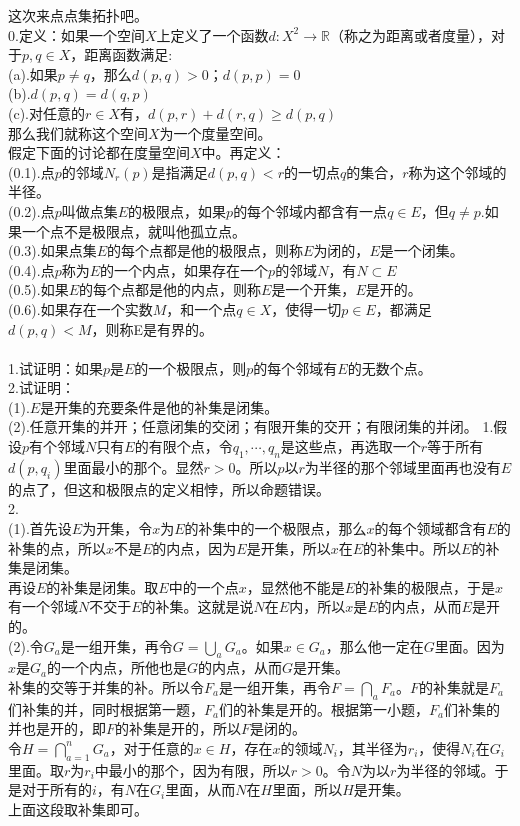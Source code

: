 \documentclass[11pt,a4paper,openany]{article}
\begin{document}
\noindent 这次来点点集拓扑吧。\\
0.定义：如果一个空间$X$上定义了一个函数$d:X^2\rightarrow\mathbb{R}$（称之为距离或者度量），对于$p,q\in X$，距离函数满足:\\
(a).如果$p\neq q$，那么$d(p,q)>0$；$d(p,p)=0$\\
(b).$d(p,q)=d(q,p)$\\
(c).对任意的$r\in X$有，$d(p,r)+d(r,q)\ge d(p,q)$\\
那么我们就称这个空间$X$为一个度量空间。\\
假定下面的讨论都在度量空间$X$中。再定义：\\
(0.1).点$p$的邻域$N_r(p)$是指满足$d(p,q)<r$的一切点$q$的集合，$r$称为这个邻域的半径。\\
(0.2).点$p$叫做点集$E$的极限点，如果$p$的每个邻域内都含有一点$q\in E$，但$q \neq p$.如果一个点不是极限点，就叫他孤立点。\\
(0.3).如果点集$E$的每个点都是他的极限点，则称$E$为闭的，$E$是一个闭集。\\
(0.4).点$p$称为$E$的一个内点，如果存在一个$p$的邻域$N$，有$N\subset E$\\
(0.5).如果$E$的每个点都是他的内点，则称$E$是一个开集，$E$是开的。\\
(0.6).如果存在一个实数$M$，和一个点$q \in X$，使得一切$p \in E$，都满足$d(p,q)<M$，则称E是有界的。\\
\\
1.试证明：如果$p$是$E$的一个极限点，则$p$的每个邻域有$E$的无数个点。\\
2.试证明：\\
(1).$E$是开集的充要条件是他的补集是闭集。\\
(2).任意开集的并开；任意闭集的交闭；有限开集的交开；有限闭集的并闭。
\newpage
\noindent 1.假设$p$有个邻域$N$只有$E$的有限个点，令$q_1,\cdots,q_n$是这些点，再选取一个$r$等于所有$d(p,q_i)$里面最小的那个。显然$r>0$。所以$p$以$r$为半径的那个邻域里面再也没有$E$的点了，但这和极限点的定义相悖，所以命题错误。\\
2.\\
(1).首先设$E$为开集，令$x$为$E$的补集中的一个极限点，那么$x$的每个领域都含有$E$的补集的点，所以$x$不是$E$的内点，因为$E$是开集，所以$x$在$E$的补集中。所以$E$的补集是闭集。\\
\indent 再设$E$的补集是闭集。取$E$中的一个点$x$，显然他不能是$E$的补集的极限点，于是$x$有一个邻域$N$不交于$E$的补集。这就是说$N$在$E$内，所以$x$是$E$的内点，从而$E$是开的。\\
(2).令$G_a$是一组开集，再令$G=\bigcup_a G_a$。如果$x\in G_a$，那么他一定在$G$里面。因为$x$是$G_a$的一个内点，所他也是$G$的内点，从而$G$是开集。\\
\indent 补集的交等于并集的补。所以令$F_a$是一组开集，再令$F=\bigcap_a F_a$。$F$的补集就是$F_a$们补集的并，同时根据第一题，$F_a$们的补集是开的。根据第一小题，$F_a$们补集的并也是开的，即$F$的补集是开的，所以$F$是闭的。\\
\indent 令$H=\bigcap_{a=1}^n G_a$，对于任意的$x\in H$，存在$x$的领域$N_i$，其半径为$r_i$，使得$N_i$在$G_i$里面。取$r$为$r_i$中最小的那个，因为有限，所以$r>0$。令$N$为以$r$为半径的邻域。于是对于所有的$i$，有$N$在$G_i$里面，从而$N$在$H$里面，所以$H$是开集。\\
\indent 上面这段取补集即可。
\end{document}
